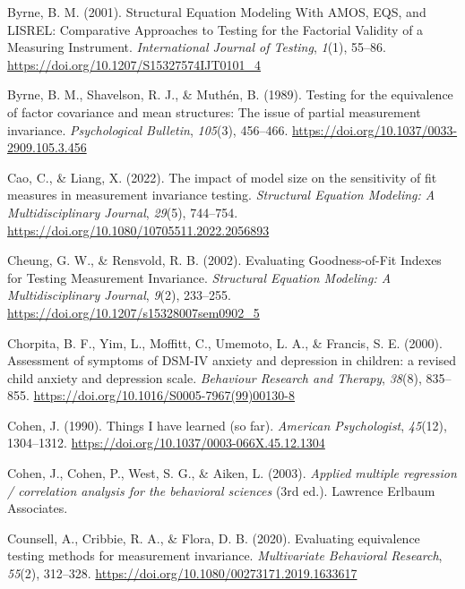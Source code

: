 \documentclass[
  man]{apa7}
\newlength{\cslhangindent}
\newlength{\cslentryspacingunit} %
\newenvironment{CSLReferences}[2] %
 {%
  \setlength{\parindent}{0pt}
  \ifodd #1
  \let\oldpar\par
  \def\par{\hangindent=\cslhangindent\oldpar}
  \fi
  \setlength{\parskip}{#2\cslentryspacingunit}
 }%
 {}
\begin{document}
\begin{CSLReferences}{1}{0}
\leavevmode{}%
Byrne, B. M. (2001). Structural Equation Modeling With AMOS, EQS, and LISREL: Comparative Approaches to Testing for the Factorial Validity of a Measuring Instrument. \emph{International Journal of Testing}, \emph{1}(1), 55--86. \url{https://doi.org/10.1207/S15327574IJT0101_4}

\leavevmode{}%
Byrne, B. M., Shavelson, R. J., \& Muthén, B. (1989). Testing for the equivalence of factor covariance and mean structures: The issue of partial measurement invariance. \emph{Psychological Bulletin}, \emph{105}(3), 456--466. \url{https://doi.org/10.1037/0033-2909.105.3.456}

\leavevmode{}%
Cao, C., \& Liang, X. (2022). The impact of model size on the sensitivity of fit measures in measurement invariance testing. \emph{Structural Equation Modeling: A Multidisciplinary Journal}, \emph{29}(5), 744--754. \url{https://doi.org/10.1080/10705511.2022.2056893}

\leavevmode{}%
Cheung, G. W., \& Rensvold, R. B. (2002). Evaluating Goodness-of-Fit Indexes for Testing Measurement Invariance. \emph{Structural Equation Modeling: A Multidisciplinary Journal}, \emph{9}(2), 233--255. \url{https://doi.org/10.1207/s15328007sem0902_5}

\leavevmode{}%
Chorpita, B. F., Yim, L., Moffitt, C., Umemoto, L. A., \& Francis, S. E. (2000). Assessment of symptoms of DSM-IV anxiety and depression in children: a revised child anxiety and depression scale. \emph{Behaviour Research and Therapy}, \emph{38}(8), 835--855. \url{https://doi.org/10.1016/S0005-7967(99)00130-8}

\leavevmode{}%
Cohen, J. (1990). Things I have learned (so far). \emph{American Psychologist}, \emph{45}(12), 1304--1312. \url{https://doi.org/10.1037/0003-066X.45.12.1304}

\leavevmode{}%
Cohen, J., Cohen, P., West, S. G., \& Aiken, L. (2003). \emph{Applied multiple regression / correlation analysis for the behavioral sciences} (3rd ed.). Lawrence Erlbaum Associates.

\leavevmode{}%
Counsell, A., Cribbie, R. A., \& Flora, D. B. (2020). Evaluating equivalence testing methods for measurement invariance. \emph{Multivariate Behavioral Research}, \emph{55}(2), 312--328. \url{https://doi.org/10.1080/00273171.2019.1633617}


\end{CSLReferences}
\end{document}

